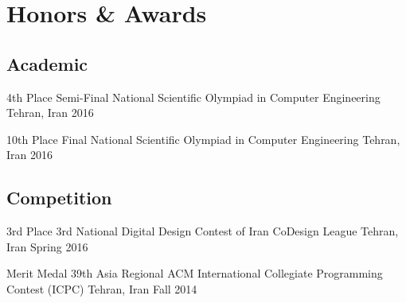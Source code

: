 \section{Honors \& Awards}

\subsection{Academic}

\cventry%
  {4th Place}
  {Semi-Final National Scientific Olympiad in Computer Engineering}
  {Tehran, Iran}{}
  {2016}{}

\cventry%
  {10th Place}
  {Final National Scientific Olympiad in Computer Engineering}
  {Tehran, Iran}{}
  {2016}{}

\subsection{Competition}

\cventry%
  {3rd Place}
  {3rd National Digital Design Contest of Iran CoDesign League}
  {Tehran, Iran}{}
  {Spring 2016}{}

\cventry%
  {Merit Medal}
  {39th Asia Regional ACM International Collegiate Programming Contest (ICPC)}
  {Tehran, Iran}{}
  {Fall 2014}{}
